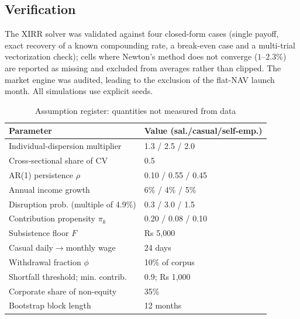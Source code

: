 \documentclass[conference]{IEEEtran}
\begin{document}
\subsection{Verification}
The XIRR solver was validated against four closed-form cases (single payoff, exact recovery of a known compounding rate, a break-even case and a multi-trial vectorization check); cells where Newton's method does not converge ($1$--$2.3\%$) are reported as missing and excluded from averages rather than clipped. The market engine was audited, leading to the exclusion of the flat-NAV launch month. All simulations use explicit seeds.

\begin{table}[!htbp]
\centering
\caption{Assumption register: quantities not measured from data}
\label{tab:assump}
\small
\begin{tabular}{ll}
\hline
Parameter & Value (sal./casual/self-emp.) \\
\hline
Individual-dispersion multiplier & 1.3 / 2.5 / 2.0 \\
Cross-sectional share of CV & 0.5 \\
AR(1) persistence $\rho$ & 0.10 / 0.55 / 0.45 \\
Annual income growth & 6\% / 4\% / 5\% \\
Disruption prob. (multiple of 4.9\%) & 0.3 / 3.0 / 1.5 \\
Contribution propensity $\pi_k$ & 0.20 / 0.08 / 0.10 \\
Subsistence floor $F$ & Rs 5,000 \\
Casual daily$\to$monthly wage & 24 days \\
Withdrawal fraction $\phi$ & 10\% of corpus \\
Shortfall threshold; min. contrib. & 0.9; Rs 1,000 \\
Corporate share of non-equity & 35\% \\
Bootstrap block length & 12 months \\
\hline
\end{tabular}
\end{table}

\end{document}
